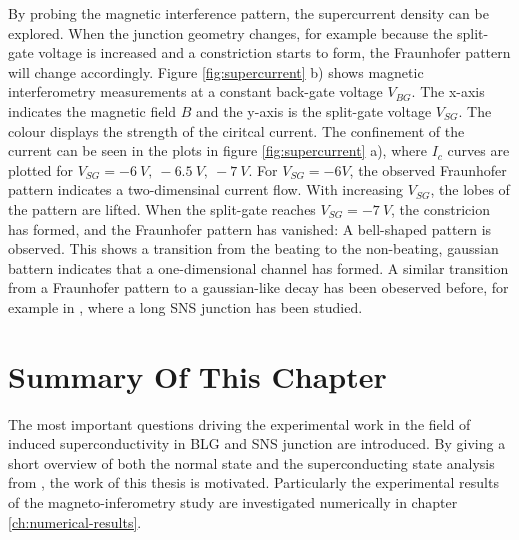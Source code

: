By probing the magnetic interference pattern, the supercurrent density can be explored. When the junction geometry changes, for example because the split-gate voltage is increased and a constriction starts to form, the Fraunhofer pattern will change accordingly. Figure \ref{fig:supercurrent} b) shows magnetic interferometry measurements at a constant back-gate voltage $V_{BG}$. The x-axis indicates the magnetic field $B$ and the y-axis is the split-gate voltage $V_{SG}$. The colour displays the strength of the ciritcal current. The confinement of the current can be seen in the plots in figure \ref{fig:supercurrent} a), where $I_c$ curves are plotted for $V_{SG} = -6\ V,\ -6.5\ V,\ -7\ V$. For $V_{SG} = -6 V$, the observed Fraunhofer pattern indicates a two-dimensinal current flow. With increasing $V_{SG}$, the lobes of the pattern are lifted. When the split-gate reaches $V_{SG} = -7\ V$, the constricion has formed, and the Fraunhofer pattern has vanished: A bell-shaped pattern is observed. This shows a transition from the beating to the non-beating, gaussian battern indicates that a one-dimensional channel has formed. A similar transition from a Fraunhofer pattern to a gaussian-like decay has been obeserved before, for example in \cite{Chiodi2012}, where a long SNS junction has been studied.

\section{Summary Of This Chapter}
The most important questions driving the experimental work in the field of induced superconductivity in BLG and SNS junction are introduced. By giving a short overview of both the normal state and the superconducting state analysis from \cite{Kraft2017}, the work of this thesis is motivated. Particularly the experimental results of the magneto-inferometry study are investigated numerically in chapter \ref{ch:numerical-results}.